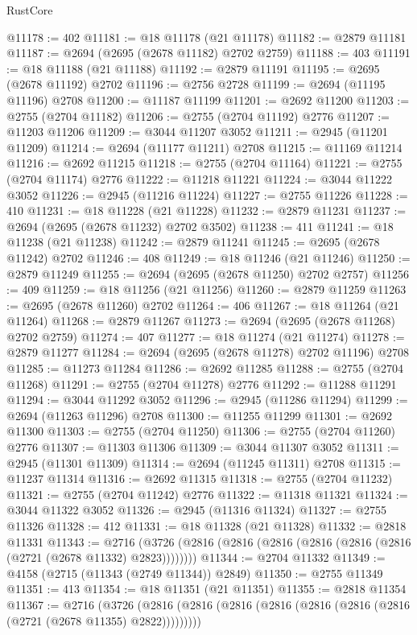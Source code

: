 \begin{lexlean}{RustCore}
\begin{coremodule}
@11178 := 402
@11181 := @18 @11178 (@21 @11178)
@11182 := @2879 @11181
@11187 := @2694 (@2695 (@2678 @11182) @2702 @2759)
@11188 := 403
@11191 := @18 @11188 (@21 @11188)
@11192 := @2879 @11191
@11195 := @2695 (@2678 @11192) @2702
@11196 := @2756 @2728
@11199 := @2694 (@11195 @11196) @2708
@11200 := @11187 @11199
@11201 := @2692 @11200
@11203 := @2755 (@2704 @11182)
@11206 := @2755 (@2704 @11192) @2776
@11207 := @11203 @11206
@11209 := @3044 @11207 @3052
@11211 := @2945 (@11201 @11209)
@11214 := @2694 (@11177 @11211) @2708
@11215 := @11169 @11214
@11216 := @2692 @11215
@11218 := @2755 (@2704 @11164)
@11221 := @2755 (@2704 @11174) @2776
@11222 := @11218 @11221
@11224 := @3044 @11222 @3052
@11226 := @2945 (@11216 @11224)
@11227 := @2755 @11226
@11228 := 410
@11231 := @18 @11228 (@21 @11228)
@11232 := @2879 @11231
@11237 := @2694 (@2695 (@2678 @11232) @2702 @3502)
@11238 := 411
@11241 := @18 @11238 (@21 @11238)
@11242 := @2879 @11241
@11245 := @2695 (@2678 @11242) @2702
@11246 := 408
@11249 := @18 @11246 (@21 @11246)
@11250 := @2879 @11249
@11255 := @2694 (@2695 (@2678 @11250) @2702 @2757)
@11256 := 409
@11259 := @18 @11256 (@21 @11256)
@11260 := @2879 @11259
@11263 := @2695 (@2678 @11260) @2702
@11264 := 406
@11267 := @18 @11264 (@21 @11264)
@11268 := @2879 @11267
@11273 := @2694 (@2695 (@2678 @11268) @2702 @2759)
@11274 := 407
@11277 := @18 @11274 (@21 @11274)
@11278 := @2879 @11277
@11284 := @2694 (@2695 (@2678 @11278) @2702 @11196) @2708
@11285 := @11273 @11284
@11286 := @2692 @11285
@11288 := @2755 (@2704 @11268)
@11291 := @2755 (@2704 @11278) @2776
@11292 := @11288 @11291
@11294 := @3044 @11292 @3052
@11296 := @2945 (@11286 @11294)
@11299 := @2694 (@11263 @11296) @2708
@11300 := @11255 @11299
@11301 := @2692 @11300
@11303 := @2755 (@2704 @11250)
@11306 := @2755 (@2704 @11260) @2776
@11307 := @11303 @11306
@11309 := @3044 @11307 @3052
@11311 := @2945 (@11301 @11309)
@11314 := @2694 (@11245 @11311) @2708
@11315 := @11237 @11314
@11316 := @2692 @11315
@11318 := @2755 (@2704 @11232)
@11321 := @2755 (@2704 @11242) @2776
@11322 := @11318 @11321
@11324 := @3044 @11322 @3052
@11326 := @2945 (@11316 @11324)
@11327 := @2755 @11326
@11328 := 412
@11331 := @18 @11328 (@21 @11328)
@11332 := @2818 @11331
@11343 := @2716 (@3726 (@2816 (@2816 (@2816 (@2816 (@2816 (@2816 (@2721 (@2678 @11332) @2823))))))))
@11344 := @2704 @11332
@11349 := @4158 (@2715 (@11343 (@2749 @11344)) @2849)
@11350 := @2755 @11349
@11351 := 413
@11354 := @18 @11351 (@21 @11351)
@11355 := @2818 @11354
@11367 := @2716
    (@3726 (@2816 (@2816 (@2816 (@2816 (@2816 (@2816 (@2816 (@2721 (@2678 @11355) @2822)))))))))

\end{coremodule}
\end{lexlean}
